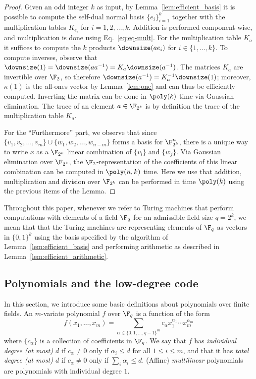 \begin{proof}
  Given an odd integer $k$ as input, by Lemma~\ref{lem:efficient_basis} it is
  possible to compute the self-dual normal basis $\{e_i\}_{i=1}^k$ together with the
  multiplication tables $K_{e_i}$ for $i = 1, 2, \ldots, k$.
  Addition is performed component-wise, and multiplication is done
  using Eq.~\eqref{eq:eq-mult}.
  For the multiplication table $K_a$ it suffices to compute the $k$ products
  $\downsize(a e_i)$ for $i\in\{1,\ldots,k\}$.
  To compute inverses, observe that $\downsize(1) = \downsize(aa^{-1}) = K_a
  \downsize(a^{-1})$.
  The matrices $K_a$ are invertible over $\F_2$, so therefore $\downsize(a^{-1}) =
  K_a^{-1} \downsize(1)$; moreover, $\kappa(1)$ is the all-ones vector
  by Lemma~\ref{lem:one} and can thus be efficiently computed.
  Inverting the matrix can be done in $\poly(k)$ time via Gaussian elimination.
  The trace of an element $a \in \F_{2^k}$ is by definition the trace of the
  multiplication table $K_a$.

  For the ``Furthermore'' part, we observe that since $\{v_1, v_2, \ldots, v_m
  \} \cup \{w_1, w_2, \ldots, w_{n-m} \}$ forms a basis for $\F_{2^k}^n$, there
  is a unique way to write $x$ as a $\F_{2^k}$ linear combination of $\{ v_i\}$
  and $\{w_j\}$.
  Via Gaussian elimination over $\F_{2^k}$, the $\F_2$-representation of the
  coefficients of this linear combination can be computed in $\poly(n,k)$ time.
  Here we use that addition, multiplication and division over $\F_{2^k}$ can be
  performed in time $\poly(k)$ using the previous items of the Lemma.
\end{proof}

\begin{remark}
  \label{rmk:tm_fields}
  Throughout this paper, whenever we refer to Turing machines that perform
  computations with elements of a field $\F_q$ for an admissible field size $q =
  2^k$, we mean that that the Turing machines are representing elements of
  $\F_q$ as vectors in $\{0,1\}^{k}$ using the basis specified by the
  algorithm of Lemma~\ref{lem:efficient_basis} and performing arithmetic as
  described in Lemma~\ref{lem:efficient_arithmetic}.
\end{remark}

\subsection{Polynomials and the low-degree code}
\label{sec:ld-encoding}

In this section, we introduce some basic definitions about polynomials over finite fields. 
An $m$-variate polynomial $f$ over $\F_q$ is a function of the form
\[
	f(x_1,\ldots,x_m) = \sum_{\alpha \in \{0,1,\ldots,q-1\}^m} c_\alpha
  x_1^{\alpha_1} \cdots x_m^{\alpha_m}
\]
where $\{c_\alpha\}$ is a collection of coefficients in $\F_q$.
We say that $f$ has \emph{individual degree (at most) $d$} if $c_\alpha\neq 0$ only if
$\alpha_i \leq d $ for all $1\leq i\leq m$, and that it has \emph{total degree
  (at most) $d$} if $c_\alpha\neq 0$ only if $\sum_i \alpha_i \leq d$.
(Affine) \emph{multilinear} polynomials are polynomials with individual degree
$1$.

